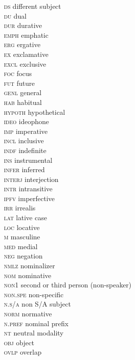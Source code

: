 \documentclass[output=paper]{LSP/langsci}
\begin{document}
\begin{tabbing}
\textsc{ds} \> different subject \\
\textsc{du} \> dual \\
\textsc{dur} \> durative \\
\textsc{emph} \> emphatic \\
\textsc{erg} \> ergative \\
\textsc{ex} \> 	exclamative \\
\textsc{excl} \> exclusive \\
\textsc{foc} \> focus \\
\textsc{fut} \> future \\
\textsc{genl} \> general \\
\textsc{hab} \> habitual \\
\textsc{hypoth} \> hypothetical \\
\textsc{ideo} \> ideophone \\
\textsc{imp} \> imperative \\
\textsc{incl} \> inclusive \\
\textsc{indf} \> indefinite \\
\textsc{ins} \> instrumental \\
\textsc{infer} \> inferred \\
\textsc{interj} \> interjection \\
\textsc{intr} \> intransitive \\
\textsc{ipfv} \> imperfective \\
\textsc{irr	} \> irrealis \\
\textsc{lat} \> lative case \\
\textsc{loc} \> locative \\
\textsc{m} \> masculine \\
\textsc{med} \> medial \\
\textsc{neg} \> negation \\
\textsc{nmlz} \> nominalizer \\
\textsc{nom} \> nominative \\
\textsc{non1} \>  second or third person (non-speaker) \\
\textsc{non.spe} \> non-specific \\
\textsc{n.s/a} non S/A subject \\
\textsc{norm} \> normative \\
\textsc{n.pref} \> nominal prefix \\
\textsc{nt} \> neutral modality \\
\textsc{obj} \> object \\
\textsc{ovlp} \> overlap \\

\end{tabbing}
\end{document}
